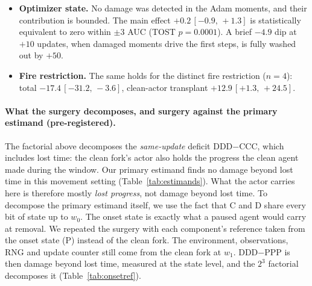 \documentclass[10pt]{article} %
\newcommand{\ci}[2]{\,[#1,\,#2]}
\begin{document}
\begin{itemize}
\item \textbf{Optimizer state.} No damage was detected in the Adam moments, and their contribution is bounded. The main effect $+0.2\ci{-0.9}{+1.3}$ is statistically equivalent to zero within $\pm3$ AUC (TOST $p=0.0001$). A brief $-4.9$ dip at $+10$ updates, when damaged moments drive the first steps, is fully washed out by $+50$.
\item \textbf{Fire restriction.} The same holds for the distinct fire restriction ($n=4$): total $-17.4\ci{-31.2}{-3.6}$, clean-actor transplant $+12.9\ci{+1.3}{+24.5}$.
\end{itemize}

\paragraph{What the surgery decomposes, and surgery against the primary estimand (pre-registered).}
The factorial above decomposes the \emph{same-update} deficit DDD$-$CCC, which includes lost time: the clean fork's actor also holds the progress the clean agent made during the window. Our primary estimand finds no damage beyond lost time in this movement setting (Table~\ref{tab:estimands}). What the actor carries here is therefore mostly \emph{lost progress}, not damage beyond lost time.
To decompose the primary estimand itself, we use the fact that C and D share every bit of state up to $w_0$. The onset state is exactly what a paused agent would carry at removal. We repeated the surgery with each component's reference taken from the onset state (P) instead of the clean fork. The environment, observations, RNG and update counter still come from the clean fork at $w_1$. DDD$-$PPP is then damage beyond lost time, measured at the state level, and the $2^3$ factorial decomposes it (Table~\ref{tab:onsetref}).
\end{document}
